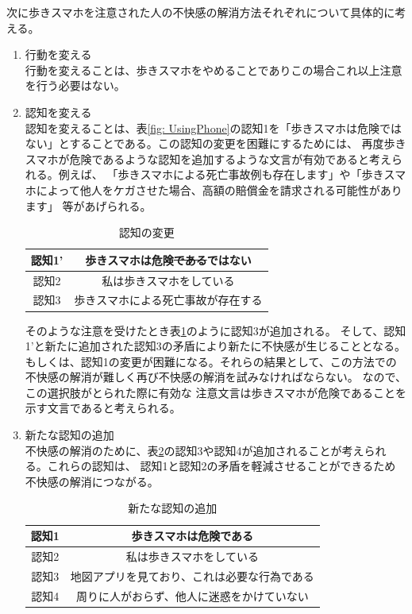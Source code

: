 \documentclass{kuisthesis}
\begin{document}
次に歩きスマホを注意された人の不快感の解消方法それぞれについて具体的に考える。
\begin{enumerate}
  \item 行動を変える \\
 行動を変えることは、歩きスマホをやめることでありこの場合これ以上注意を行う必要はない。

  \item 認知を変える \\
   認知を変えることは、表\ref{fig: UsingPhone}の認知1を「歩きスマホは危険ではない」とすることである。この認知の変更を困難にするためには、
  再度歩きスマホが危険であるような認知を追加するような文言が有効であると考えられる。例えば、
  「歩きスマホによる死亡事故例も存在します」や「歩きスマホによって他人をケガさせた場合、高額の賠償金を請求される可能性があります」
  等があげられる。
  \begin{table}[h]
    \centering
    \caption{認知の変更}
    \label{fig: AvoidDissonanceRevise}
    \begin{tabular}{c|c}
        認知1' & 歩きスマホは危険\sout{である}ではない \\ \hline
        認知2 & 私は歩きスマホをしている \\ \hline
        認知3 & 歩きスマホによる死亡事故が存在する \\
    \end{tabular}
  \end{table}
  そのような注意を受けたとき表\ref{fig: AvoidDissonanceRevise}のように認知3が追加される。
  そして、認知1'と新たに追加された認知3の矛盾により新たに不快感が生じることとなる。
  もしくは、認知1の変更が困難になる。それらの結果として、この方法での不快感の解消が難しく再び不快感の解消を試みなければならない。
  なので、この選択肢がとられた際に有効な
  注意文言は歩きスマホが危険であることを示す文言であると考えられる。

  \item 新たな認知の追加 \\
  不快感の解消のために、表\ref{fig: AvoidDissonance}の認知3や認知4が追加されることが考えられる。これらの認知は、
  認知1と認知2の矛盾を軽減させることができるため不快感の解消につながる。
  \begin{table}[h]
    \centering
    \caption{新たな認知の追加}
    \label{fig: AvoidDissonance}
    \begin{tabular}{c|c}
        認知1 & 歩きスマホは危険である \\ \hline
        認知2 & 私は歩きスマホをしている \\ \hline
        認知3 & 地図アプリを見ており、これは必要な行為である \\\hline
        認知4 & 周りに人がおらず、他人に迷惑をかけていない \\ 
    \end{tabular}
    

\end{table}
\end{enumerate}
\end{document}
